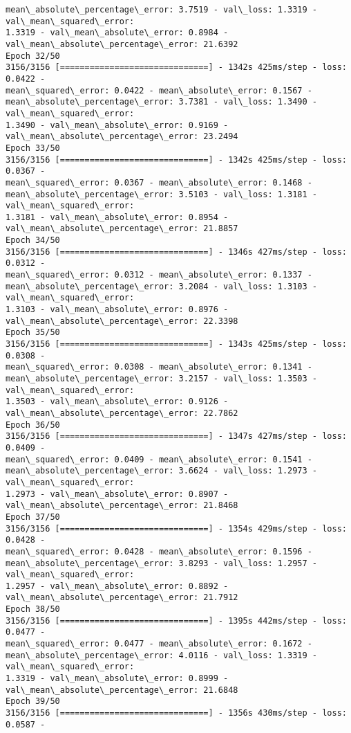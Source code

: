 \documentclass[11pt]{article}
\begin{document}
\begin{Verbatim}[commandchars=\\\{\},fontsize=\footnotesize]
mean\_absolute\_percentage\_error: 3.7519 - val\_loss: 1.3319 - val\_mean\_squared\_error:
1.3319 - val\_mean\_absolute\_error: 0.8984 - val\_mean\_absolute\_percentage\_error: 21.6392
Epoch 32/50
3156/3156 [==============================] - 1342s 425ms/step - loss: 0.0422 -
mean\_squared\_error: 0.0422 - mean\_absolute\_error: 0.1567 -
mean\_absolute\_percentage\_error: 3.7381 - val\_loss: 1.3490 - val\_mean\_squared\_error:
1.3490 - val\_mean\_absolute\_error: 0.9169 - val\_mean\_absolute\_percentage\_error: 23.2494
Epoch 33/50
3156/3156 [==============================] - 1342s 425ms/step - loss: 0.0367 -
mean\_squared\_error: 0.0367 - mean\_absolute\_error: 0.1468 -
mean\_absolute\_percentage\_error: 3.5103 - val\_loss: 1.3181 - val\_mean\_squared\_error:
1.3181 - val\_mean\_absolute\_error: 0.8954 - val\_mean\_absolute\_percentage\_error: 21.8857
Epoch 34/50
3156/3156 [==============================] - 1346s 427ms/step - loss: 0.0312 -
mean\_squared\_error: 0.0312 - mean\_absolute\_error: 0.1337 -
mean\_absolute\_percentage\_error: 3.2084 - val\_loss: 1.3103 - val\_mean\_squared\_error:
1.3103 - val\_mean\_absolute\_error: 0.8976 - val\_mean\_absolute\_percentage\_error: 22.3398
Epoch 35/50
3156/3156 [==============================] - 1343s 425ms/step - loss: 0.0308 -
mean\_squared\_error: 0.0308 - mean\_absolute\_error: 0.1341 -
mean\_absolute\_percentage\_error: 3.2157 - val\_loss: 1.3503 - val\_mean\_squared\_error:
1.3503 - val\_mean\_absolute\_error: 0.9126 - val\_mean\_absolute\_percentage\_error: 22.7862
Epoch 36/50
3156/3156 [==============================] - 1347s 427ms/step - loss: 0.0409 -
mean\_squared\_error: 0.0409 - mean\_absolute\_error: 0.1541 -
mean\_absolute\_percentage\_error: 3.6624 - val\_loss: 1.2973 - val\_mean\_squared\_error:
1.2973 - val\_mean\_absolute\_error: 0.8907 - val\_mean\_absolute\_percentage\_error: 21.8468
Epoch 37/50
3156/3156 [==============================] - 1354s 429ms/step - loss: 0.0428 -
mean\_squared\_error: 0.0428 - mean\_absolute\_error: 0.1596 -
mean\_absolute\_percentage\_error: 3.8293 - val\_loss: 1.2957 - val\_mean\_squared\_error:
1.2957 - val\_mean\_absolute\_error: 0.8892 - val\_mean\_absolute\_percentage\_error: 21.7912
Epoch 38/50
3156/3156 [==============================] - 1395s 442ms/step - loss: 0.0477 -
mean\_squared\_error: 0.0477 - mean\_absolute\_error: 0.1672 -
mean\_absolute\_percentage\_error: 4.0116 - val\_loss: 1.3319 - val\_mean\_squared\_error:
1.3319 - val\_mean\_absolute\_error: 0.8999 - val\_mean\_absolute\_percentage\_error: 21.6848
Epoch 39/50
3156/3156 [==============================] - 1356s 430ms/step - loss: 0.0587 -

\end{Verbatim}
\end{document}
